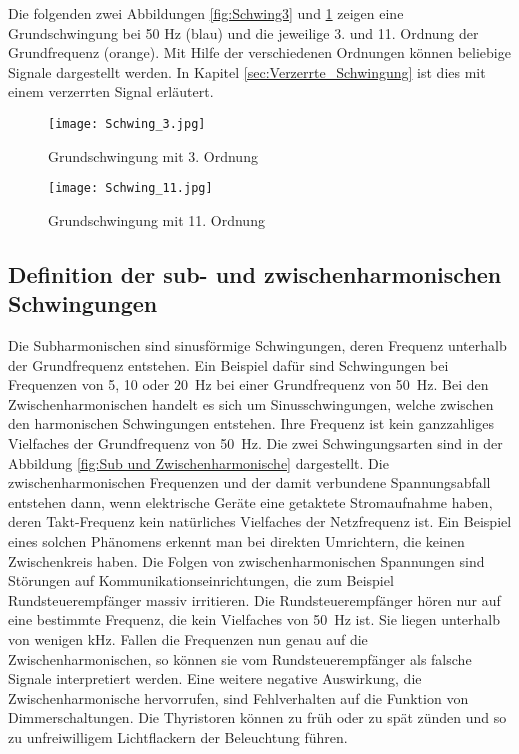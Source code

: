 Die folgenden zwei Abbildungen \ref{fig:Schwing3} und \ref{fig:Schwing11} zeigen eine Grundschwingung bei 50 Hz (blau) und die jeweilige 3. und 11. Ordnung der Grundfrequenz (orange). Mit Hilfe der verschiedenen Ordnungen können beliebige Signale dargestellt werden. In Kapitel \ref{sec:Verzerrte_Schwingung} ist dies mit einem verzerrten Signal erläutert. 

\begin{figure}[ht!]
	\begin{minipage}[t]{0.49\textwidth}
		\centering
		\texttt{[image: Schwing\_3.jpg]}	
		\caption{Grundschwingung mit 3. Ordnung \cite{Oberwellen}}\label{fig:Schwing3}
	\end{minipage}	
	\begin{minipage}[t]{0.49\textwidth}	
		\centering	
		\texttt{[image: Schwing\_11.jpg]}	
		\caption{Grundschwingung mit 11. Ordnung \cite{Oberwellen}}\label{fig:Schwing11}
	\end{minipage}
\end{figure}

\newpage
\subsection{Definition der sub- und zwischenharmonischen Schwingungen}

Die Subharmonischen sind sinusförmige Schwingungen, deren Frequenz unterhalb der Grundfrequenz entstehen. Ein Beispiel dafür sind Schwingungen bei Frequenzen von 5, 10 oder \SI{20}{Hz} bei einer Grundfrequenz von \SI{50}{Hz}. Bei den Zwischenharmonischen handelt es sich um Sinusschwingungen, welche zwischen den harmonischen Schwingungen entstehen. Ihre Frequenz ist kein ganzzahliges Vielfaches der Grundfrequenz von \SI{50}{Hz}. Die zwei Schwingungsarten sind in der Abbildung \ref{fig:Sub und Zwischenharmonische} dargestellt. Die zwischenharmonischen Frequenzen und der damit verbundene Spannungsabfall entstehen dann, wenn elektrische Geräte eine getaktete Stromaufnahme haben, deren Takt-Frequenz kein natürliches Vielfaches der Netzfrequenz ist. Ein Beispiel eines solchen Phänomens erkennt man bei direkten Umrichtern, die keinen Zwischenkreis haben. Die Folgen von zwischenharmonischen Spannungen sind Störungen auf Kommunikationseinrichtungen, die zum Beispiel Rundsteuerempfänger massiv irritieren. Die Rundsteuerempfänger hören nur auf eine bestimmte Frequenz, die kein Vielfaches von \SI{50}{Hz} ist. Sie liegen unterhalb von wenigen kHz. Fallen die Frequenzen nun genau auf die Zwischenharmonischen, so können sie vom Rundsteuerempfänger als falsche Signale interpretiert werden. Eine weitere negative Auswirkung, die Zwischenharmonische hervorrufen, sind Fehlverhalten auf die Funktion von Dimmerschaltungen. Die Thyristoren können zu früh oder zu spät zünden und so zu unfreiwilligem Lichtflackern der Beleuchtung führen. 

